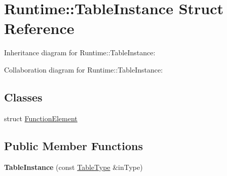 \hypertarget{struct_runtime_1_1_table_instance}{}\section{Runtime\+:\+:Table\+Instance Struct Reference}
\label{struct_runtime_1_1_table_instance}


Inheritance diagram for Runtime\+:\+:Table\+Instance\+:


Collaboration diagram for Runtime\+:\+:Table\+Instance\+:
\subsection*{Classes}
\begin{DoxyCompactItemize}
\item 
struct \mbox{\hyperlink{struct_runtime_1_1_table_instance_1_1_function_element}{Function\+Element}}
\end{DoxyCompactItemize}
\subsection*{Public Member Functions}
\begin{DoxyCompactItemize}
\item 
\mbox{\label{struct_runtime_1_1_table_instance_ad194e9e6205152a9e93f42c09e157f37}} 
{\bfseries Table\+Instance} (const \mbox{\hyperlink{struct_i_r_1_1_table_type}{Table\+Type}} \&in\+Type)
\end{DoxyCompactItemize}
